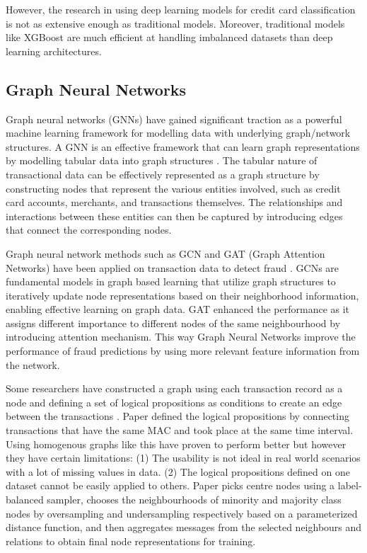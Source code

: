 \documentclass[pdflatex,sn-mathphys-num]{sn-jnl}%
\begin{document}
However, the research in using deep learning models for credit card classification is not as extensive enough as traditional models. Moreover, traditional models like XGBoost are much efficient at handling imbalanced datasets than deep learning architectures.

\subsection{Graph Neural Networks}\label{subsec2}

Graph neural networks (GNNs) have gained significant traction as a powerful machine learning framework for modelling data with underlying graph/network structures. A GNN is an effective framework that can learn graph representations by modelling tabular data into graph structures \cite{li2024}. The tabular nature of transactional data can be effectively represented as a graph structure by constructing nodes that represent the various entities involved, such as credit card accounts, merchants, and transactions themselves. The relationships and interactions between these entities can then be captured by introducing edges that connect the corresponding nodes. 

Graph neural network methods such as GCN and GAT (Graph Attention Networks) have been applied on transaction data to detect fraud \cite{taing2022}. GCNs are fundamental models in graph based learning that utilize graph structures to iteratively update node representations based on their neighborhood information, enabling effective learning on graph data. GAT enhanced the performance as it assigns different importance to different nodes of the same neighbourhood by introducing attention mechanism. This way Graph Neural Networks improve the performance of fraud predictions by using more relevant feature information from the network.

Some researchers have constructed a graph using each transaction record as a node and defining a set of logical propositions as conditions to create an edge between the transactions \cite{liu2021-2} \cite{tian2023}. Paper \cite{liu2021-2} defined the logical propositions by connecting transactions that have the same MAC and took place at the same time interval. Using homogenous graphs like this have proven to perform better \cite{taing2022} but however they have certain limitations: (1) The usability is not ideal in real world scenarios with a lot of missing values in data. (2) The logical propositions defined on one dataset cannot be easily applied to others. Paper \cite{liu2021-3} picks centre nodes using a label-balanced sampler, chooses the neighbourhoods of minority and majority class nodes by oversampling and undersampling respectively based on a parameterized distance function, and then aggregates messages from the selected neighbours and relations to obtain final node representations for training.
\end{document}
